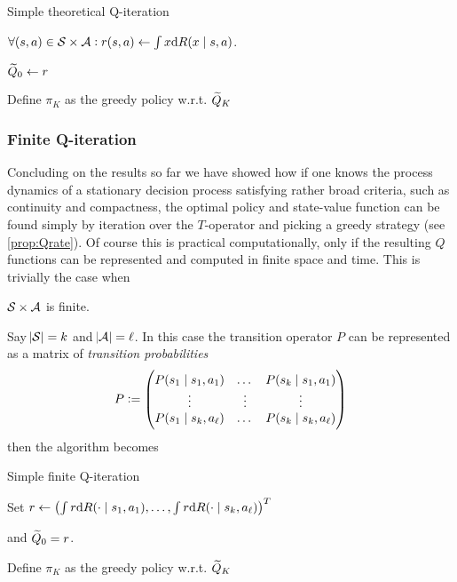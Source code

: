 \begin{algorithm}[H] %
\caption{Simple theoretical Q-iteration}
$\forall (s, a) \in \mathcal{S} \times \mathcal{A} :
r(s, a) \leftarrow \int x \mathrm{d} R(x \mid s, a)$.

$\widetilde{Q}_0 \leftarrow r$

Define $\pi_K$ as the greedy policy w.r.t. $\widetilde{Q}_K$ \\
\label{alg:theoSimpleQ}
\end{algorithm}

\subsubsection{Finite Q-iteration}
Concluding on the results so far
we have showed how if one knows the process dynamics
of a stationary decision process satisfying rather broad criteria, 
such as continuity and compactness,
the optimal policy and state-value function can be found
simply by iteration over the $T$-operator and picking a greedy strategy
(see \cref{prop:Qrate}).
Of course this is practical computationally, only if
the resulting $Q$ functions can be represented and computed in finite
space and time.
This is trivially the case when
\begin{asm}
  $\mathcal{S}\times\mathcal{A}$ is finite.
  \label{asm:finite}
\end{asm}
Say $\abs{\mathcal{S}} = k$ and $\abs{\mathcal{A}} = \ell$.
In this case the transition operator $P$ can be represented as a
matrix of \emph{transition probabilities}
\[ P \vcentcolon= \begin{pmatrix}
    P(s_1 \mid s_1, a_1) & \dots & P(s_k \mid s_1, a_1)
    \\ \vdots & \vdots & \vdots
    \\ P(s_1 \mid s_k, a_\ell) & \dots & P(s_k \mid s_k, a_\ell)
\end{pmatrix} \]
then the algorithm becomes

\begin{algorithm}[H] %
\caption{Simple finite Q-iteration}
Set $ r \leftarrow \left(\int r \mathrm{d} R(\cdot \mid s_1, a_1),
\dots, \int r \mathrm{d} R(\cdot \mid s_k, a_\ell) \right)^T $

and $ \widetilde{Q}_0 = r$.

Define $\pi_K$ as the greedy policy w.r.t. $\widetilde{Q}_K$ \\
\label{alg:finiteSimpleQ}
\end{algorithm}

